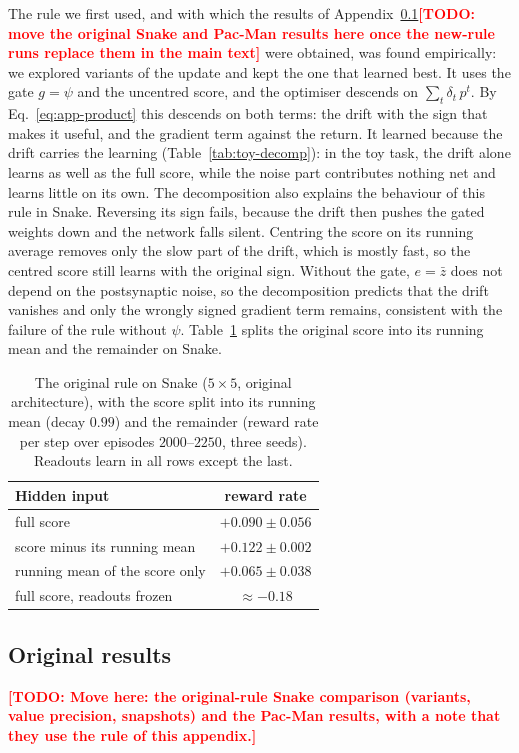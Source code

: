 \documentclass[10pt,twocolumn]{article}
\newcommand{\todo}[1]{\textcolor{red}{\bfseries[TODO: #1]}}
\begin{document}
The rule we first used, and with which the results of
Appendix~\ref{app:original-results}\todo{move the original Snake and Pac-Man
results here once the new-rule runs replace them in the main text} were
obtained, was found empirically: we explored variants of the update and kept
the one that learned best. It uses the gate $g=\psi$ and the uncentred score, and
the optimiser descends on $\sum_t\delta_t\,p^t$. By
Eq.~\eqref{eq:app-product} this descends on both terms: the drift with the sign
that makes it useful, and the gradient term against the return. It learned
because the drift carries the learning (Table~\ref{tab:toy-decomp}): in the toy task,
the drift alone learns as well as the full score, while the noise part contributes
nothing net and learns little on its own. The decomposition also explains the
behaviour of this rule in Snake. Reversing its sign fails, because the drift then
pushes the gated weights down and the network falls silent. Centring the score
on its running average removes only the slow part of the drift, which is mostly
fast, so the centred score still learns with the original sign. Without the gate,
$e=\bar z$ does not depend on the postsynaptic noise, so the decomposition
predicts that the drift vanishes and only the wrongly signed gradient term
remains, consistent with the failure of the rule without $\psi$. Table~\ref{tab:orig-snake} splits the original score into its running
mean and the remainder on Snake.

\begin{table}[h]
\centering\small
\caption{The original rule on Snake ($5\times5$, original architecture), with
the score split into its running mean (decay $0.99$) and the remainder (reward
rate per step over episodes $2000$--$2250$, three seeds). Readouts learn in all
rows except the last.}
\label{tab:orig-snake}
\begin{tabular}{lc}
\toprule
Hidden input & reward rate\\
\midrule
full score & $+0.090\pm0.056$\\
score minus its running mean & $+0.122\pm0.002$\\
running mean of the score only & $+0.065\pm0.038$\\
full score, readouts frozen & $\approx-0.18$\\
\bottomrule
\end{tabular}
\end{table}

\subsection{Original results}
\label{app:original-results}
\todo{Move here: the original-rule Snake comparison (variants, value precision,
snapshots) and the Pac-Man results, with a note that they use the rule of this
appendix.}
\end{document}
